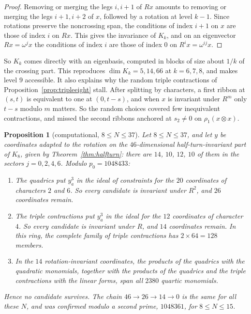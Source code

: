 \documentclass[11pt]{amsart}
\newtheorem{proposition}[theorem]{Proposition}
\theoremstyle{definition}
\theoremstyle{remark}
\theoremstyle{plain}
\numberwithin{equation}{section}
\numberwithin{table}{section}
\begin{document}
\begin{proof}
Removing or merging the legs $i,i+1$ of $Rx$ amounts to removing or merging the legs $i+1,i+2$ of $x$, followed by a rotation at level $k-1$. Since rotations preserve the noncrossing span, the conditions of index $i+1$ on $x$ are those of index $i$ on $Rx$. This gives the invariance of $K_k$, and on an eigenvector $Rx=\omega^jx$ the conditions of index $i$ are those of index $0$ on $R^ix=\omega^{ij}x$.
\end{proof}

So $K_k$ comes directly with an eigenbasis, computed in blocks of size about $1/k$ of the crossing part. This reproduces $\dim K_k=5,14,66$ at $k=6,7,8$, and makes level $9$ accessible. It also explains why the random triple contractions of Proposition~\ref{prop:tripleeight} stall. After splitting by characters, a first ribbon at $(s,t)$ is equivalent to one at $(0,t-s)$, and when $x$ is invariant under $R^m$ only $t-s$ modulo $m$ matters. So the random choices covered few inequivalent contractions, and missed the second ribbons anchored at $s_2\ne0$ on $\rho_1(x\otimes x)$.

\begin{proposition}[computational, $8\le N\le37$]\label{prop:closeeight}
Let $8\le N\le37$, and let $y$ be coordinates adapted to the rotation on the $46$-dimensional half-turn-invariant part of $K_8$, given by Theorem~\ref{thm:halfturn}: there are $14$, $10$, $12$, $10$ of them in the sectors $j=0,2,4,6$. Modulo $p_0=1048433$:
\begin{enumerate}
\item The quadrics put $y_a^3$ in the ideal of constraints for the $20$ coordinates of characters $2$ and $6$. So every candidate is invariant under $R^2$, and $26$ coordinates remain.
\item The triple contractions put $y_a^3$ in the ideal for the $12$ coordinates of character $4$. So every candidate is invariant under $R$, and $14$ coordinates remain. In this ring, the complete family of triple contractions has $2\times64=128$ members.
\item In the $14$ rotation-invariant coordinates, the products of the quadrics with the quadratic monomials, together with the products of the quadrics and the triple contractions with the linear forms, span all $2380$ quartic monomials.
\end{enumerate}
Hence no candidate survives. The chain $46\to26\to14\to0$ is the same for all these $N$, and was confirmed modulo a second prime, $1048361$, for $8\le N\le15$.
\end{proposition}
\end{document}
